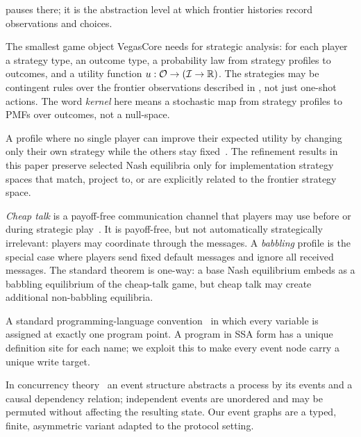 \begin{description}[itemsep=0pt,leftmargin=1.2em,style=nextline]
  pauses there; it is the abstraction level at which frontier histories
  record observations and choices.
\item[Kernel game.]
  The smallest game object VegasCore needs for strategic analysis: for
  each player a strategy type, an outcome type, a probability law from
  strategy profiles to outcomes, and a utility function
  $u : \mathcal{O} \to (\mathcal{I} \to \mathbb{R})$.  The strategies may be
  contingent rules over the frontier observations described in
  , not just one-shot actions.  The word
  \emph{kernel} here means a stochastic map from strategy profiles to
  PMFs over outcomes, not a null-space.
\item[Nash equilibrium.]
  A profile where no single player can improve their expected utility by
  changing only their own strategy while the others stay
  fixed~\citep{Nash1951,OsborneRubinstein1994}.  The refinement results
  in this paper preserve selected Nash equilibria only for
  implementation strategy spaces that match, project to, or are
  explicitly related to the frontier strategy space.
\item[Cheap talk / babbling.]
  \emph{Cheap talk} is a payoff-free communication channel that players
  may use before or during strategic play~\citep{CrawfordSobel1982}.  It is
  payoff-free, but not
  automatically strategically irrelevant: players may coordinate through
  the messages.  A \emph{babbling} profile is the special case where
  players send fixed default messages and ignore all received messages.
  The standard theorem is one-way: a base Nash equilibrium embeds as a
  babbling equilibrium of the cheap-talk game, but cheap talk may create
  additional non-babbling equilibria.
\item[Static-single-assignment (SSA).]
  A standard programming-language convention~\citep{cytron1991efficiently}
  in which every variable is assigned at exactly one program point.  A
  program in SSA form has a unique definition site for each name; we
  exploit this to make every event node carry a unique write target.
\item[Event structure / event graph.]
  In concurrency theory~\citep{NielsenPlotkinWinskel1981,Winskel1987EventStructures}
  an event structure abstracts a process by its events and a causal
  dependency relation; independent events are unordered and may be
  permuted without affecting the resulting state.  Our event graphs
  are a typed, finite, asymmetric variant adapted to the protocol
  setting.
\item[Refinement / forward simulation.]

\end{description}
